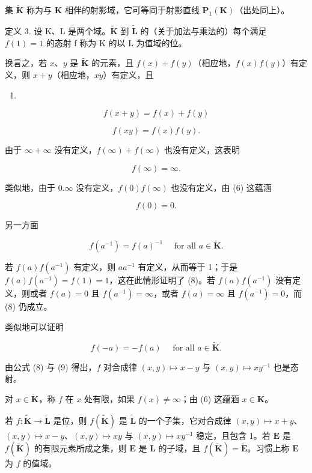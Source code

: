 集 \(\tilde{\mathbf{K}}\) 称为与 \(\mathbf{K}\) 相伴的射影域，它可等同于射影直线 \(\mathbf{P}_1(\mathbf{K})\)（出处同上）。

定义 3. 设 K、L 是两个域。\(\tilde{\mathbf{K}}\) 到 \(\tilde{\mathbf{L}}\) 的（关于加法与乘法的）每个满足 \(f(1) = 1\) 的态射 f 称为 K 的以 L 为值域的位。

换言之，若 \(x\)、\(y\) 是 \(\tilde{\mathbf{K}}\) 的元素，且 \(f(x) + f(y)\)（相应地，\(f(x)f(y)\)）有定义，则 \(x + y\)（相应地，\(xy\)）有定义，且

\begin{enumerate}
\def\labelenumi{(\arabic{enumi})}
\setcounter{enumi}{3}
\tightlist
\item
\end{enumerate}

\[
f (x + y) = f (x) + f (y)\tag{4}
\]

\[
f (x y) = f (x) f (y).\tag{5}
\]

由于 \(\infty +\infty\) 没有定义，\(f(\infty) + f(\infty)\) 也没有定义，这表明

\[
f (\infty) = \infty .\tag{6}
\]

类似地，由于 \(0.\infty\) 没有定义，\(f(0)f(\infty)\) 也没有定义，由 (6) 这蕴涵

\[
f (0) = 0.\tag{7}
\]

另一方面

\[
f (a ^ {- 1}) = f (a) ^ {- 1} \quad \text {   for   all   } a \in \tilde {\mathbf {K}}.\tag{8}
\]

若 \(f(a)f(a^{-1})\) 有定义，则 \(aa^{-1}\) 有定义，从而等于 1；于是 \(f(a)f(a^{-1}) = f(1) = 1\)，这在此情形证明了 (8)。若 \(f(a)f(a^{-1})\) 没有定义，则或者 \(f(a) = 0\) 且 \(f(a^{-1}) = \infty\)，或者 \(f(a) = \infty\) 且 \(f(a^{-1}) = 0\)，而 (8) 仍成立。

类似地可以证明

\[
f (- a) = - f (a) \quad \text {   for   all   } a \in \tilde {\mathbf {K}}.\tag{9}
\]

由公式 (8) 与 (9) 得出，\(f\) 对合成律 \((x, y) \mapsto x - y\) 与 \((x, y) \mapsto xy^{-1}\) 也是态射。

对 \(x \in \tilde{\mathbf{K}}\)，称 \(f\) 在 \(x\) 处有限，如果 \(f(x) \neq \infty\)；由 (6) 这蕴涵 \(x \in \mathbf{K}\)。

若 \(f \colon \tilde{\mathbf{K}} \to \tilde{\mathbf{L}}\) 是位，则 \(f(\tilde{\mathbf{K}})\) 是 \(\tilde{\mathbf{L}}\) 的一个子集，它对合成律 \((x, y) \mapsto x + y\)、\((x, y) \mapsto x - y\)、\((x, y) \mapsto xy\) 与 \((x, y) \mapsto xy^{-1}\) 稳定，且包含 1。若 \(\mathbf{E}\) 是 \(f(\tilde{\mathbf{K}})\) 的有限元素所成之集，则 \(\mathbf{E}\) 是 \(\mathbf{L}\) 的子域，且 \(f(\tilde{\mathbf{K}}) = \tilde{\mathbf{E}}\)。习惯上称 \(\mathbf{E}\) 为 \(f\) 的值域。

